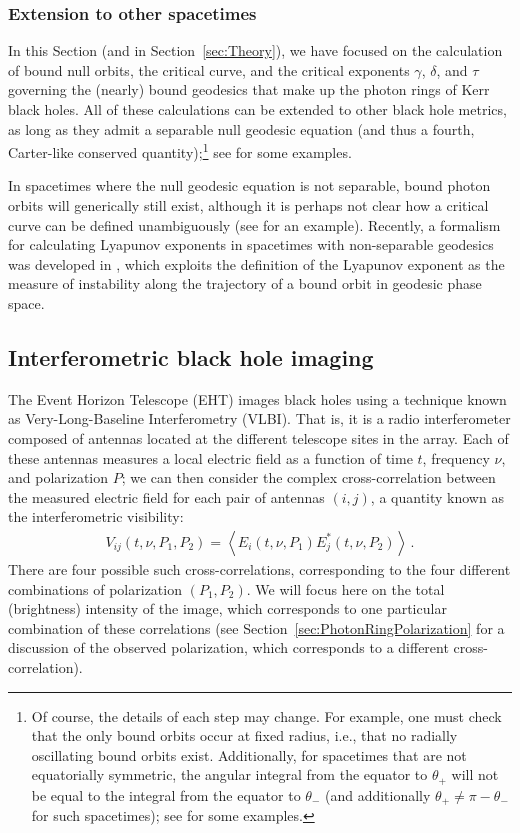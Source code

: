 \documentclass[graybox,envcountchap]{svmult}
\newcommand{\av}[1]{\left\langle#1\right\rangle}
\begin{document}
\subsubsection*{Extension to other spacetimes}

In this Section (and in Section~\ref{sec:Theory}), we have focused on the calculation of bound null orbits, the critical curve, and the critical exponents $\gamma$, $\delta$, and $\tau$ governing the (nearly) bound geodesics that make up the photon rings of Kerr black holes.
All of these calculations can be extended to other black hole metrics, as long as they admit a separable null geodesic equation (and thus a fourth, Carter-like conserved quantity);\footnote{Of course, the details of each step may change.
For example, one must check that the only bound orbits occur at fixed radius, i.e., that no radially oscillating bound orbits exist.
Additionally, for spacetimes that are not equatorially symmetric, the angular integral from the equator to $\theta_+$ will not be equal to the integral from the equator to $\theta_-$ (and additionally $\theta_+\neq\pi-\theta_-$ for such spacetimes); see \cite{Staelens2023} for some examples.}
see \cite{Staelens2022, Staelens2023, Wielgus2021,Ayzenberg2022,Omwoyo2023,Olmo2023} for some examples.

In spacetimes where the null geodesic equation is not separable, bound photon orbits will generically still exist, although it is perhaps not clear how a critical curve can be defined unambiguously (see \cite{Staelens2023} for an example).
Recently, a formalism for calculating Lyapunov exponents in spacetimes with non-separable geodesics was developed in \cite{Deich2023}, which exploits the definition of the Lyapunov exponent as the measure of instability along the trajectory of a bound orbit in geodesic phase space.

\subsection{Interferometric black hole imaging}
\label{sec:Interferometry}

The Event Horizon Telescope (EHT) images black holes using a technique known as Very-Long-Baseline Interferometry (VLBI).
That is, it is a radio interferometer composed of antennas located at the different telescope sites in the array.
Each of these antennas measures a local electric field as a function of time $t$, frequency $\nu$, and polarization $P$; we can then consider the complex cross-correlation between the measured electric field for each pair of antennas $(i,j)$, a quantity known as the interferometric visibility:
\begin{align}
    V_{ij}(t,\nu,P_1,P_2)=\av{E_i(t,\nu,P_1)E_j^*(t,\nu,P_2)}\,.
\end{align}
There are four possible such cross-correlations, corresponding to the four different combinations of polarization $(P_1,P_2)$.
We will focus here on the total (brightness) intensity of the image, which corresponds to one particular combination of these correlations \cite{Roberts1994} (see Section~\ref{sec:PhotonRingPolarization} for a discussion of the observed polarization, which corresponds to a different cross-correlation).
\end{document}
